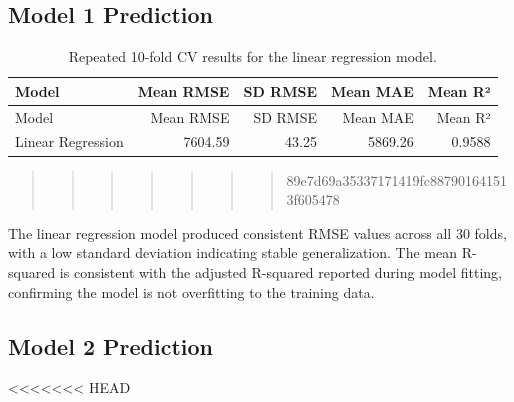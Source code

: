 \documentclass[
]{article}
\begin{document}
\subsection{Model 1 Prediction}\label{model-1-prediction-1}

\begin{longtable}[]{@{}lrrrr@{}}
\caption{Repeated 10-fold CV results for the linear regression
model.}\tabularnewline
\toprule\noalign{}
Model & Mean RMSE & SD RMSE & Mean MAE & Mean R² \\
\midrule\noalign{}
\endfirsthead
\toprule\noalign{}
Model & Mean RMSE & SD RMSE & Mean MAE & Mean R² \\
\midrule\noalign{}
\endhead
\bottomrule\noalign{}
\endlastfoot
Linear Regression & 7604.59 & 43.25 & 5869.26 & 0.9588 \\
\end{longtable}

\begin{quote}
\begin{quote}
\begin{quote}
\begin{quote}
\begin{quote}
\begin{quote}
\begin{quote}
89e7d69a35337171419fc887901641513f605478
\end{quote}
\end{quote}
\end{quote}
\end{quote}
\end{quote}
\end{quote}
\end{quote}

The linear regression model produced consistent RMSE values across all
30 folds, with a low standard deviation indicating stable
generalization. The mean R-squared is consistent with the adjusted
R-squared reported during model fitting, confirming the model is not
overfitting to the training data.

\subsection{Model 2 Prediction}\label{model-2-prediction}

\textless\textless\textless\textless\textless\textless\textless{} HEAD
\end{document}
